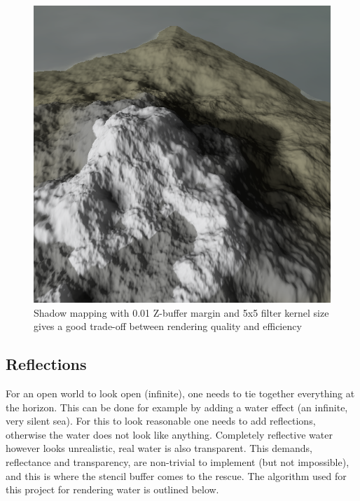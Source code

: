 \documentclass{article}
\begin{document}
\begin{figure}[H]
\centering
    \centering
    \includegraphics[scale=0.5]{shadowMargin1Filter2}
    \caption{Shadow mapping with 0.01 Z-buffer margin and 5x5 filter kernel size gives a good trade-off between rendering quality and efficiency}
    \label{fig:shadowMapMarginFilter}
\end{figure}

\subsection{Reflections}
For an open world to look open (infinite), one needs to tie together everything at the horizon.
This can be done for example by adding a water effect (an infinite, very silent sea). For this to look reasonable one needs to add reflections, otherwise the water does not look like anything.
Completely reflective water however looks unrealistic, real water is also transparent. This demands, reflectance and transparency, are non-trivial to implement (but not impossible), and this is where the stencil buffer comes to the rescue. The algorithm used for this project for rendering water is outlined below.
\end{document}

